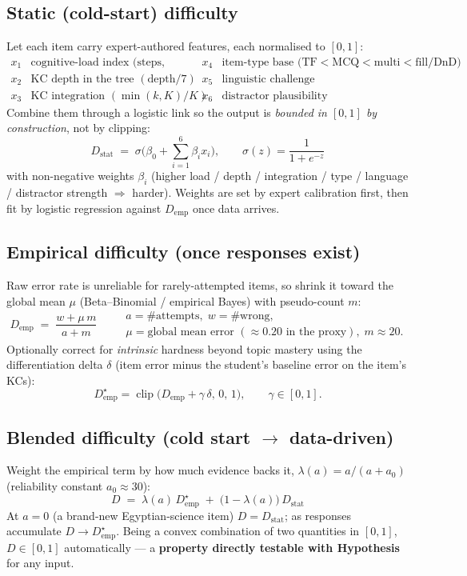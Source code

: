 \documentclass[11pt]{article}
\begin{document}
\subsection{Static (cold-start) difficulty}
Let each item carry expert-authored features, each normalised to $[0,1]$:
\[
\begin{array}{llll}
x_1 & \text{cognitive-load index (steps, variables)} & x_4 & \text{item-type base (TF}<\text{MCQ}<\text{multi}<\text{fill/DnD)}\\
x_2 & \text{KC depth in the tree }(\text{depth}/7) & x_5 & \text{linguistic challenge (negation/``except'')}\\
x_3 & \text{KC integration }(\min(k,K)/K) & x_6 & \text{distractor plausibility}
\end{array}
\]
Combine them through a logistic link so the output is \emph{bounded in $[0,1]$ by construction}, not by clipping:
\[
\boxed{\,D_{\text{stat}} \;=\; \sigma\!\Big(\beta_0+\textstyle\sum_{i=1}^{6}\beta_i x_i\Big),\qquad \sigma(z)=\frac{1}{1+e^{-z}}\,}
\]
with non-negative weights $\beta_i$ (higher load / depth / integration / type / language / distractor strength $\Rightarrow$ harder). Weights are set by expert calibration first, then fit by logistic regression against $D_{\text{emp}}$ once data arrives.

\subsection{Empirical difficulty (once responses exist)}
Raw error rate is unreliable for rarely-attempted items, so shrink it toward the global mean $\mu$ (Beta--Binomial / empirical Bayes) with pseudo-count $m$:
\[
\boxed{\,D_{\text{emp}} \;=\; \frac{w+\mu\,m}{a+m}\,}\qquad
\begin{array}{l}
a=\text{\#attempts},\; w=\text{\#wrong},\\
\mu=\text{global mean error }(\approx0.20\text{ in the proxy}),\; m\approx20 .
\end{array}
\]
Optionally correct for \emph{intrinsic} hardness beyond topic mastery using the differentiation delta $\delta$ (item error minus the student's baseline error on the item's KCs):
\[
D_{\text{emp}}^{\star}=\operatorname{clip}\!\big(D_{\text{emp}}+\gamma\,\delta,\,0,\,1\big),\qquad \gamma\in[0,1].
\]

\subsection{Blended difficulty (cold start $\rightarrow$ data-driven)}
Weight the empirical term by how much evidence backs it, $\lambda(a)=a/(a+a_0)$ (reliability constant $a_0\approx30$):
\[
\boxed{\,D \;=\; \lambda(a)\,D_{\text{emp}}^{\star} \;+\; \big(1-\lambda(a)\big)\,D_{\text{stat}}\,}
\]
At $a=0$ (a brand-new Egyptian-science item) $D=D_{\text{stat}}$; as responses accumulate $D\to D_{\text{emp}}^{\star}$. Being a convex combination of two quantities in $[0,1]$, $D\in[0,1]$ automatically --- a \textbf{property directly testable with Hypothesis} for any input.
\end{document}
